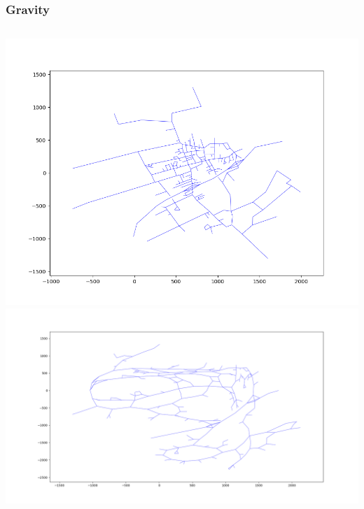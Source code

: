 \documentclass[12pt,t,xcolor=dvipsnames]{beamer}
\begin{document}
\begin{frame}
  \frametitle{Gravity}

  \begin{columns}[t]
  \centering
  \includegraphics[height=.45\textheight]{../pngs/map3_original}\\
  \includegraphics[width=.65\textwidth]{../pngs/map3_constg}
  \end{columns}
  
  
\end{frame}
\end{document}
